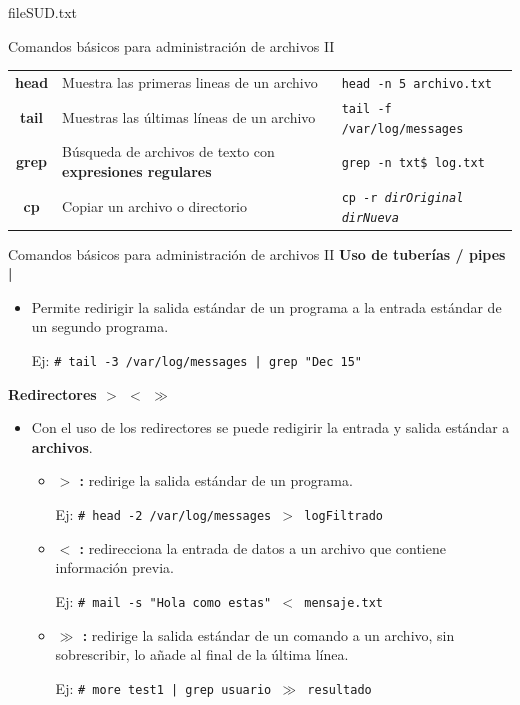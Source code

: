 \documentclass{beamer}
\begin{document}
\begin{frame}{fileSUD.txt}



\end{frame}
\begin{frame}{Comandos básicos para administración de archivos II}
\scriptsize
\begin{tabular}{c|p{5cm}|l}
\hline
\textbf{head} & Muestra las primeras lineas de un archivo   & \texttt{head -n 5 archivo.txt}\\
\textbf{tail}  & Muestras las últimas líneas de un archivo  & \texttt{tail -f /var/log/messages}\\
\textbf{grep} & Búsqueda de archivos de texto con \textbf{expresiones regulares}   &\texttt{grep -n txt\$ log.txt}\\
\textbf{cp} & Copiar un archivo o directorio  & \texttt{cp -r \textit{dirOriginal} \textit{dirNueva}}
\end{tabular}

\end{frame}
\begin{frame}{Comandos básicos para administración de archivos II}
\textbf{Uso de tuberías / pipes |}
\begin{itemize}
  \item Permite redirigir la salida estándar de un programa a la entrada estándar de un segundo programa.\\
  \begin{center}
    Ej: \texttt{\# tail -3 /var/log/messages | grep "Dec 15"}
  \end{center}
\end{itemize}
\textbf{Redirectores $>$ $<$ $\gg$}
\begin{itemize}
  \item Con el uso de los redirectores se puede redigirir la entrada y salida estándar a \textbf{archivos}.
  \begin{itemize}
    \item \textbf{$>$ :} redirige la salida estándar de un programa.
    \begin{center}
      Ej: \texttt{\# head -2 /var/log/messages $>$ logFiltrado}
    \end{center}
    \item \textbf{$<$ :} redirecciona la entrada de datos a un archivo que contiene información previa.
    \begin{center}
      Ej: \texttt{\# mail -s "Hola como estas" $<$ mensaje.txt}
    \end{center}
    \item \textbf{$\gg$ :} redirige la salida estándar de un comando a un archivo, sin sobrescribir, lo añade al final de la última línea.
    \begin{center}
      Ej: \texttt{\# more test1 | grep usuario $\gg$ resultado}
    \end{center}
  \end{itemize}
\end{itemize}

\end{frame}
\end{document}
